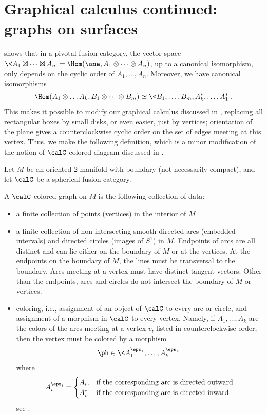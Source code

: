 \section{Graphical calculus continued: graphs on surfaces}\label{s:graphical2}

 shows that in a pivotal fusion category, the vector
space $\< A_1\boxtimes\dots\boxtimes A_n\>=\Hom(\one, A_1\otimes\dots\otimes
A_n)$, up to a canonical isomorphism, only depends on the cyclic order of $A_1,
\dots, A_n$. Moreover, we have canonical isomorphisms
$$
   \Hom(A_1\otimes \dots A_k, B_1\otimes\dots\otimes B_m)\simeq
   \<B_1, \dots, B_m,
  A_k^*,\dots, A_1^*\>.
$$
This makes it possible to modify our graphical calculus discussed in
, replacing all rectangular boxes by small disks, or even
easier, just by vertices; orientation of the plane gives a counterclockwise
cyclic order on the set of edges meeting at this vertex. Thus, we make the
following definition, which is a minor modification of the notion of
$\calC$-colored diagram discussed in .
\begin{definition}
  Let $M$ be an oriented 2-manifold with boundary (not necessarily compact), and
  let $\calC$ be a spherical fusion category.

  A $\calC$-colored graph on $M$ is the following collection of data:
  \begin{itemize}
    \item a finite collection of points (vertices) in the interior of $M$

    \item a finite collection of non-intersecting smooth directed arcs (embedded
    intervals) and directed circles (images of $S^1$) in $M$. Endpoints of arcs
    are all distinct and can lie either on the boundary of $M$ or at the
    vertices. At the endpoints on the boundary of $M$, the lines must be
    transversal to the boundary. Arcs meeting at a vertex must have distinct
    tangent vectors. Other than the endpoints, arcs and circles do not intersect
    the boundary of $M$ or vertices.

    \item coloring, i.e., assignment of an object of $\calC$ to every arc or
    circle, and assignment of a morphism in $\calC$ to every vertex. Namely, if
    $A_1, \dots, A_k$ are the colors of the arcs meeting at a vertex $v$, listed
    in counterclockwise order, then the vertex must be colored by a morphism
    $$
      \ph\in \<
        A_1^{\eps_1},\dots, A_k^{\eps_k}\>
    $$
    where
    \begin{equation}\label{e:signed-object2}
      A_i^{\eps_i} =\begin{cases}
                   A_i, & \text{if the corresponding arc is directed outward}\\
                   A_i^* &\text{if the corresponding arc is directed inward}
                   \end{cases}
    \end{equation}
    see .
  \end{itemize}


\end{definition}

